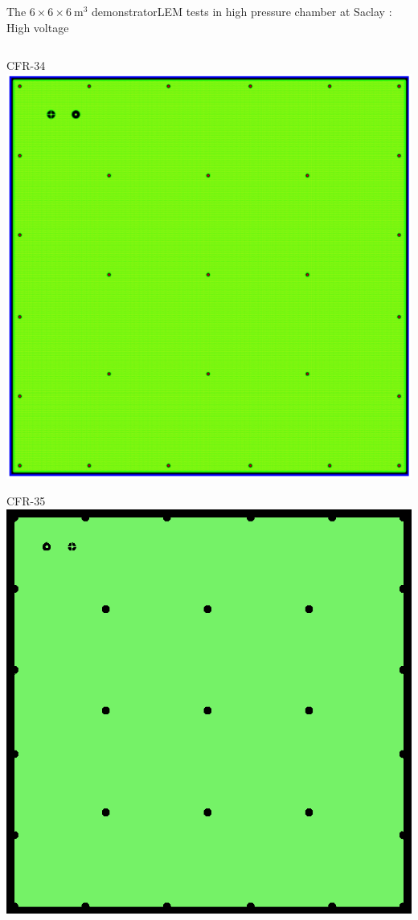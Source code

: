 \documentclass[10pt]{beamer}
\begin{document}
\begin{frame}{The \texorpdfstring{$6 \times 6 \times \SI{6}{\meter\cubed}$}{666} demonstrator}{LEM tests in high pressure chamber at Saclay : High voltage}
\begin{scriptsize}
\begin{columns}
	    		\begin{column}{0.48\textwidth}
	    			\begin{minipage}{0.48\textwidth}
	    				\centering CFR-34
	    				\includegraphics[width=\textwidth]{figures/666/CFR-34.png}
	    			\end{minipage}\hfill
	    			\begin{minipage}{0.48\textwidth}
	    				\centering CFR-35
	    				\includegraphics[width=\textwidth]{figures/666/CFR-35.png}

\end{minipage}
\end{column}
\end{columns}
\end{scriptsize}
\end{frame}
\end{document}
